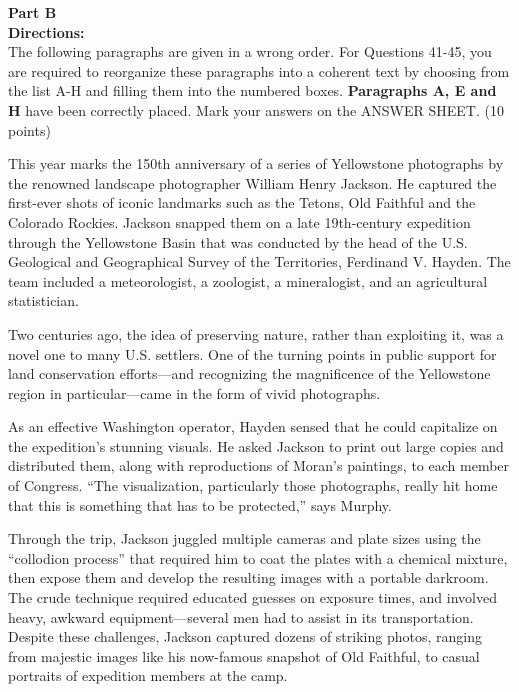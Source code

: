 \newpage

\noindent
\textbf{Part B}\\
\textbf{Directions:}\\
The following paragraphs are given in a wrong order. For Questions 41-45, you are required to reorganize these paragraphs into a coherent text by choosing from the list A-H and filling them into the numbered boxes. \textbf{Paragraphs A, E and H} have been correctly placed. Mark your answers on the ANSWER SHEET. (10 points)

\TiGanSpace


\begin{listmatch}
\item 
This year marks the 150th anniversary of a series of Yellowstone photographs by the renowned landscape photographer William Henry Jackson. He captured the first-ever shots of iconic landmarks such as the Tetons, Old Faithful and the Colorado Rockies. Jackson snapped them on a late 19th-century expedition through the Yellowstone Basin that was conducted by the head of the U.S. Geological and Geographical Survey of the Territories, Ferdinand V. Hayden. The team included a meteorologist, a zoologist, a mineralogist, and an agricultural statistician.


\item 
Two centuries ago, the idea of preserving nature, rather than exploiting it, was a novel one to many U.S. settlers. One of the turning points in public support for land conservation efforts—and recognizing the magnificence of the Yellowstone region in particular—came in the form of vivid photographs.

\item 
As an effective Washington operator, Hayden sensed that he could capitalize on the expedition's stunning visuals. He asked Jackson to print out large copies and distributed them, along with reproductions of Moran's paintings, to each member of Congress. ``The visualization, particularly those photographs, really hit home that this is something that has to be protected,'' says Murphy.


\item 
Through the trip, Jackson juggled multiple cameras and plate sizes using the ``collodion process'' that required him to coat the plates with a chemical mixture, then expose them and develop the resulting images with a portable darkroom. The crude technique required educated guesses on exposure times, and involved heavy, awkward equipment—several men had to assist in its transportation. Despite these challenges, Jackson captured dozens of striking photos, ranging from majestic images like his now-famous snapshot of Old Faithful, to casual portraits of expedition members at the camp.



\end{listmatch}

